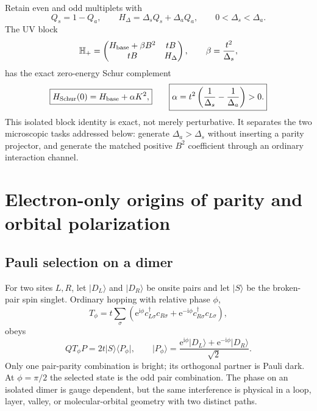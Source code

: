 \documentclass[11pt]{article}
\theoremstyle{definition}
\theoremstyle{remark}
\newcommand{\I}{\mathrm i}
\newcommand{\e}{\mathrm e}
\newcommand{\ket}[1]{\lvert #1\rangle}
\newcommand{\bra}[1]{\langle #1\rvert}
\begin{document}
Retain even and odd multiplets with
\begin{equation}
 Q_s=1-Q_a,
 \qquad
 H_\Delta=\Delta_sQ_s+\Delta_aQ_a,
 \qquad0<\Delta_s<\Delta_a.
\end{equation}
The UV block
\begin{equation}
 \mathbb H_+=
 \begin{pmatrix}
 H_{\rm base}+\beta B^2&tB\\
 tB&H_\Delta
 \end{pmatrix},
 \qquad \beta=\frac{t^2}{\Delta_s},
 \label{eq:comp-UV}
\end{equation}
has the exact zero-energy Schur complement
\begin{equation}
 \boxed{H_{\rm Schur}(0)=H_{\rm base}+\alpha K^2,}
 \qquad
 \boxed{\alpha=t^2\left(\frac1{\Delta_s}-\frac1{\Delta_a}\right)>0.}
 \label{eq:comp-Schur}
\end{equation}
This isolated block identity is exact, not merely perturbative.  It separates the two microscopic tasks addressed below: generate $\Delta_a>\Delta_s$ without inserting a parity projector, and generate the matched positive $B^2$ coefficient through an ordinary interaction channel.

\section{Electron-only origins of parity and orbital polarization}
\label{sec:electron-only}

\subsection{Pauli selection on a dimer}

For two sites $L,R$, let $\ket{D_L}$ and $\ket{D_R}$ be onsite pairs and let $\ket S$ be the broken-pair spin singlet.  Ordinary hopping with relative phase $\phi$,
\begin{equation}
 T_\phi=t\sum_\sigma(\e^{\I\phi}c_{L\sigma}^\dagger c_{R\sigma}
 +\e^{-\I\phi}c_{R\sigma}^\dagger c_{L\sigma}),
\end{equation}
obeys
\begin{equation}
 QT_\phi P=2t\ket S\bra{P_\phi},
 \qquad
 \ket{P_\phi}=\frac{\e^{\I\phi}\ket{D_L}+\e^{-\I\phi}\ket{D_R}}{\sqrt2}.
 \label{eq:Pauli-selector}
\end{equation}
Only one pair-parity combination is bright; its orthogonal partner is Pauli dark.  At $\phi=\pi/2$ the selected state is the odd pair combination.  The phase on an isolated dimer is gauge dependent, but the same interference is physical in a loop, layer, valley, or molecular-orbital geometry with two distinct paths.
\end{document}
